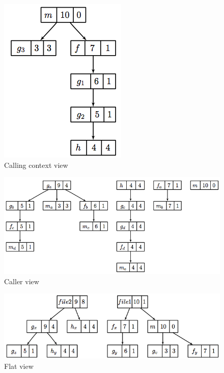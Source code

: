 \documentclass[a4paper,11pt]{article}
\begin{document}
\begin{figure}
\begin{center}
\caption{Calling context view} 
\label{fig:cct}
\includegraphics[scale=0.5]{images/metrics-cct.png}
\end{center}
\end{figure}

\begin{figure}
\begin{center}
\caption{Caller view} 
\label{fig:ct}
\includegraphics[scale=0.5]{images/metrics-ct.png}
\end{center}
\end{figure}

\begin{figure}
\begin{center}
\caption{Flat view} 
\label{fig:ft}
\includegraphics[scale=0.5]{images/metrics-ft.png}
\end{center}
\end{figure}
\end{document}
